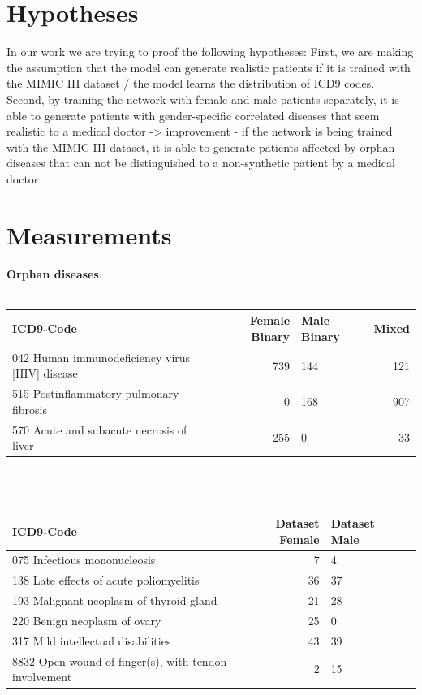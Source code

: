 \documentclass[11pt, a4paper]{book}
\begin{document}
\section{Hypotheses}
In our work we are trying to proof the following hypotheses:
First, we are making the assumption that the model can generate realistic patients if it is trained with the MIMIC III dataset / the model learns the distribution of ICD9 codes.
Second, by training the network with female and male patients separately, it is able to generate patients with gender-specific correlated diseases that seem realistic to a medical doctor -> improvement
- if the network is being trained with the MIMIC-III dataset, it is able to generate patients affected by orphan diseases that can not be distinguished to a non-synthetic patient by a medical doctor



\section{Measurements}
\textbf{Orphan diseases}:
\\
\\
\begin{tabularx}{\textwidth}{p{}|r|X|r}
ICD9-Code & Female Binary & Male Binary & Mixed\\
\hline
042 Human immunodeficiency virus [HIV] disease	& 739 & 144	& 121\\
515 Postinflammatory pulmonary fibrosis & 0 & 168 & 907\\
570 Acute and subacute necrosis of liver & 255	& 0	& 33\\
\end{tabularx}
\\
\\
\begin{tabularx}{\textwidth}{p{}|r|X|r}
ICD9-Code & Dataset Female & Dataset Male\\
\hline
075 Infectious mononucleosis & 7 & 4\\
138 Late effects of acute poliomyelitis & 36 & 37 \\
193 Malignant neoplasm of thyroid gland & 21 & 28 \\
220 Benign neoplasm of ovary & 25	& 0\\
317 Mild intellectual disabilities & 43 & 39\\
8832 Open wound of finger(s), with tendon involvement & 2 & 15\\ 
\end{tabularx}
	
\end{document}
